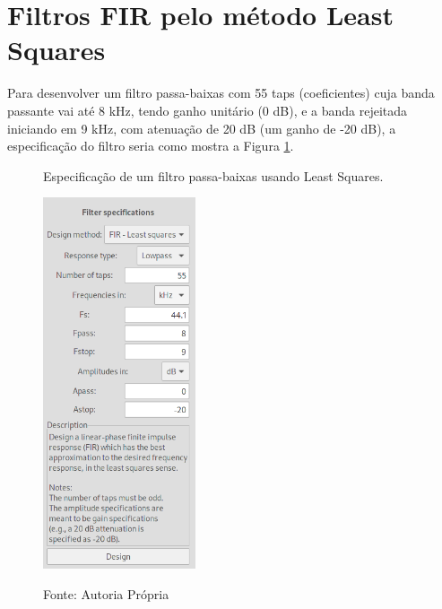 \documentclass[12pt,a4paper]{report}
\begin{document}
\section{Filtros FIR pelo método Least Squares}
  Para desenvolver um filtro passa-baixas com 55 taps (coeficientes) cuja banda passante vai até 8 kHz, tendo
  ganho unitário (0 dB), e a banda rejeitada iniciando em 9 kHz, com atenuação de 20 dB (um ganho de -20 dB), a
  especificação do filtro seria como mostra a Figura \ref{fig:least_squares_specifications}.
  \begin{figure}[H]
    \caption{Especificação de um filtro passa-baixas usando Least Squares.}
    \centering
    \includegraphics[width=0.4\textwidth]{images/least_squares_specifications}
    \label{fig:least_squares_specifications}
    \caption*{Fonte: Autoria Própria}
  \end{figure}
  
\end{document}
